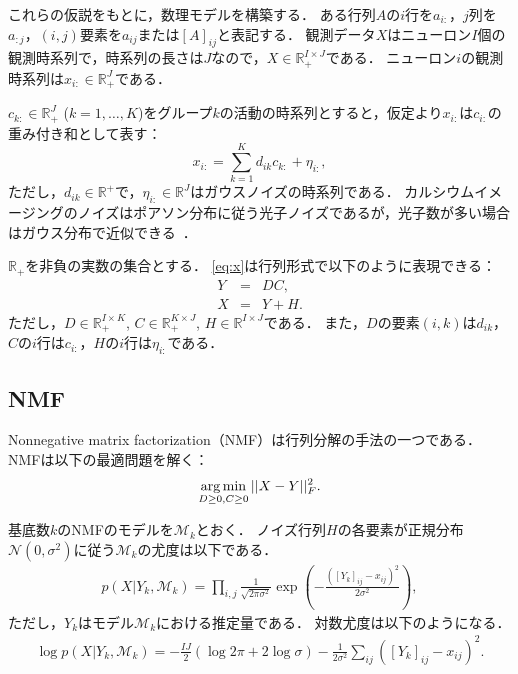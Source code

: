 これらの仮説をもとに，数理モデルを構築する．
ある行列$A$の$i$行を$a_{i:}$，$j$列を$a_{:j}$，$(i,j)$要素を$a_{ij}$または$[A]_{ij}$と表記する．
観測データ$X$はニューロン$I$個の観測時系列で，時系列の長さは$J$なので，$X \in \mathbb{R}_+^{I \times J}$である．
ニューロン$i$の観測時系列は$x_{i:} \in \mathbb{R}_+^{J}$である．

$c_{k:} \in \mathbb{R}^J_+$ ($k=1,\dots,K$)をグループ$k$の活動の時系列とすると，仮定より$x_{i:}$は$c_{i:}$の重み付き和として表す：
\begin{equation}
	x_{i:} = \sum_{k=1}^K d_{ik} c_{k:} + \eta_{i:},
  \label{eq:x}
\end{equation}
ただし，$d_{ik} \in \mathbb{R}^+$で，$\eta_{i:} \in \mathbb{R}^J$はガウスノイズの時系列である．
カルシウムイメージングのノイズはポアソン分布に従う光子ノイズであるが，光子数が多い場合はガウス分布で近似できる~\cite{Sjulson2007}．

$\mathbb{R}_+$を非負の実数の集合とする．
\eqref{eq:x}は行列形式で以下のように表現できる：
\begin{eqnarray}
  Y &=& DC, \\
  X &=& Y + H.
  \label{eq:model_matrix}
\end{eqnarray}
ただし，$D \in \mathbb{R}_+^{I \times K}$, $C \in \mathbb{R}_+^{K \times J}$, $H \in \mathbb{R}^{I \times J}$である．
また，$D$の要素$(i,k)$は$d_{ik}$，$C$の$i$行は$c_{i:}$，$H$の$i$行は$\eta_{i:}$である．

\subsection{NMF}
Nonnegative matrix factorization（NMF）\cite{Lee1999}は行列分解の手法の一つである．
NMFは以下の最適問題を解く：
\begin{equation}
	\operatorname*{arg\,min}_{D \geq 0, C \geq 0} ||X - Y||_F^2.
  \label{eq:NMF}
\end{equation}

基底数$k$のNMFのモデルを$\mathcal{M}_k$とおく．
ノイズ行列$H$の各要素が正規分布$\mathcal{N} (0, \sigma^2)$に従う$\mathcal{M}_k$の尤度は以下である．
\begin{eqnarray}
	p(X | Y_k, \mathcal{M}_k) = \prod_{i,j} \frac{1}{\sqrt{2 \pi \sigma^2}} \exp(-\frac{([Y_k]_{ij} - x_{ij})^2}{2 \sigma^2}),
\end{eqnarray}
ただし，$Y_k$はモデル$\mathcal{M}_k$における推定量である．
対数尤度は以下のようになる．
\begin{eqnarray}
	\log p(X | Y_k, \mathcal{M}_k) = - \frac{IJ}{2} (\log 2\pi + 2 \log \sigma) - \frac{1}{2 \sigma^2} \sum_{ij}([Y_k]_{ij} - x_{ij})^2.
\end{eqnarray}

